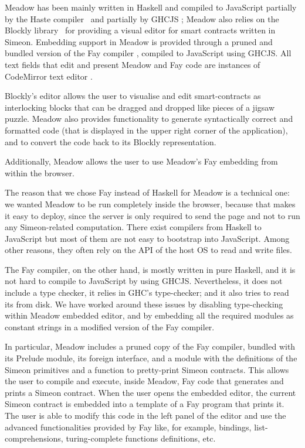 \documentclass[runningheads]{llncs}
\begin{document}
Meadow has been mainly written in Haskell and compiled to JavaScript
partially by the Haste compiler~\cite{Haste} and partially by GHCJS \cite{GHCJS};
Meadow also relies on the Blockly library~\cite{Blockly} for providing a visual
editor for smart contracts written in Simeon. Embedding support in Meadow
is provided through a pruned and bundled version of the Fay compiler \cite{Fay},
compiled to JavaScript using GHCJS. All text fields that edit and present Meadow and Fay code are
instances of CodeMirror text editor \cite{CodeMirror}.

Blockly's editor allows the user to visualise and edit
smart-contracts as interlocking blocks that can be dragged and dropped
like pieces of a jigsaw puzzle. %
Meadow also provides functionality to generate syntactically correct
and formatted code (that is displayed in the upper right corner of the application),
and to convert the code back to its Blockly representation.

Additionally, Meadow allows the user to use Meadow's Fay embedding from within the browser. %

The reason that we chose Fay instead of Haskell for Meadow is a technical one: we wanted Meadow to be run completely inside 
the browser, because that makes it easy to deploy, since the server is only required to send the page and not to 
run any Simeon-related computation. There exist compilers from Haskell to JavaScript but most of them are not easy to 
bootstrap into JavaScript. Among other reasons, they often rely on the API of the host OS to read and write files.

The Fay compiler, on the other hand, is mostly written in pure Haskell, and it is not hard to compile to JavaScript by 
using GHCJS. Nevertheless, it does not include a type checker, it relies in GHC's type-checker; and it also 
tries to read its  from disk. We have worked around these issues by disabling type-checking 
within Meadow embedded editor, and by embedding all the required modules as constant strings in a modified version 
of the Fay compiler.

In particular, Meadow includes a pruned copy of the Fay compiler, bundled with its Prelude module, its foreign 
interface, and a module with the definitions of the Simeon primitives and a function to pretty-print 
Simeon contracts. This allows the user to compile and execute, inside Meadow, Fay code that generates and prints 
a Simeon contract. When the user opens the embedded editor, the current Simeon contract is embedded into a template 
of a Fay program that prints it. The user is able to modify this code in the left panel of the editor and use the 
advanced functionalities provided by Fay like, for example, bindings, list-comprehensions, turing-complete functions 
definitions, etc.
\end{document}
